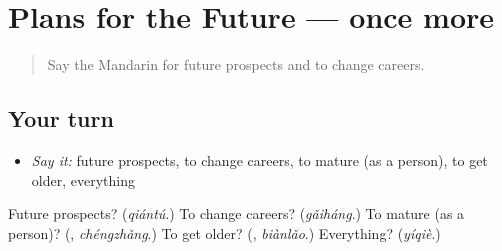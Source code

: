 \section[(dialogue)]{Plans for the Future — once more}

\label{lesson:ZH-R401-review-final-401}



\begin{quote}
Say the Mandarin for future prospects and to change careers.
\end{quote}

\subsection*{Your turn}
\begin{itemize}
\raggedright
  \item \emph{Say it:} future prospects, to change careers, to mature (as a person), to get older, everything
\end{itemize}

\begin{tcolorbox}[breakable,colback=teal!4,colframe=teal!35!black,title={Before you move on}]
Future prospects? (\emph{qiántú}.) To change careers? (\emph{gǎiháng}.) To mature (as a person)? (\textbf{}, \emph{chéngzhǎng}.) To get older? (\textbf{}, \emph{biànlǎo}.) Everything? (\emph{yíqiè}.)
\end{tcolorbox}
